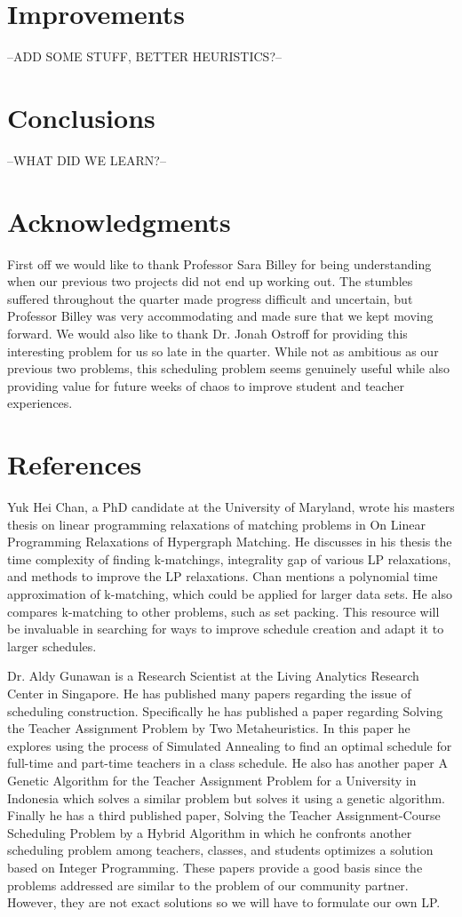 \documentclass[11pt]{article}
\begin{document}
\section{Improvements}
--ADD SOME STUFF, BETTER HEURISTICS?--

\section{Conclusions}
--WHAT DID WE LEARN?--

\section{Acknowledgments}
First off we would like to thank Professor Sara Billey for being understanding when our previous two projects did not end up working out. The stumbles suffered throughout the quarter made progress difficult and uncertain, but Professor Billey was very accommodating and made sure that we kept moving forward. We would also like to thank Dr. Jonah Ostroff for providing this interesting problem for us so late in the quarter. While not as ambitious as our previous two problems, this scheduling problem seems genuinely useful while also providing value for future weeks of chaos to improve student and teacher experiences.

\section{References}
Yuk Hei Chan, a PhD candidate at the University of Maryland, wrote his masters thesis on linear programming relaxations of matching problems in On Linear Programming Relaxations of Hypergraph Matching. He discusses in his thesis the time complexity of finding k-matchings, integrality gap of various LP relaxations, and methods to improve the LP relaxations. Chan mentions a polynomial time approximation of k-matching, which could be applied for larger data sets. He also compares k-matching to other problems, such as set packing. This resource will be invaluable in searching for ways to improve schedule creation and adapt it to larger schedules.

Dr. Aldy Gunawan is a Research Scientist at the Living Analytics Research Center in Singapore. He has published many papers regarding the issue of scheduling construction. Specifically he has published a paper regarding Solving the Teacher Assignment Problem by Two Metaheuristics. In this paper he explores using the process of Simulated Annealing to find an optimal schedule for full-time and part-time teachers in a class schedule. He also has another paper A Genetic Algorithm for the Teacher Assignment Problem for a University in Indonesia which solves a similar problem but solves it using a genetic algorithm. Finally he has a third published paper, Solving the Teacher Assignment-Course Scheduling Problem by a Hybrid Algorithm in which he confronts another scheduling problem among teachers, classes, and students optimizes a solution based on Integer Programming. These papers provide a good basis since the problems addressed are similar to the problem of our community partner. However, they are not exact solutions so we will have to formulate our own LP.
\end{document}
